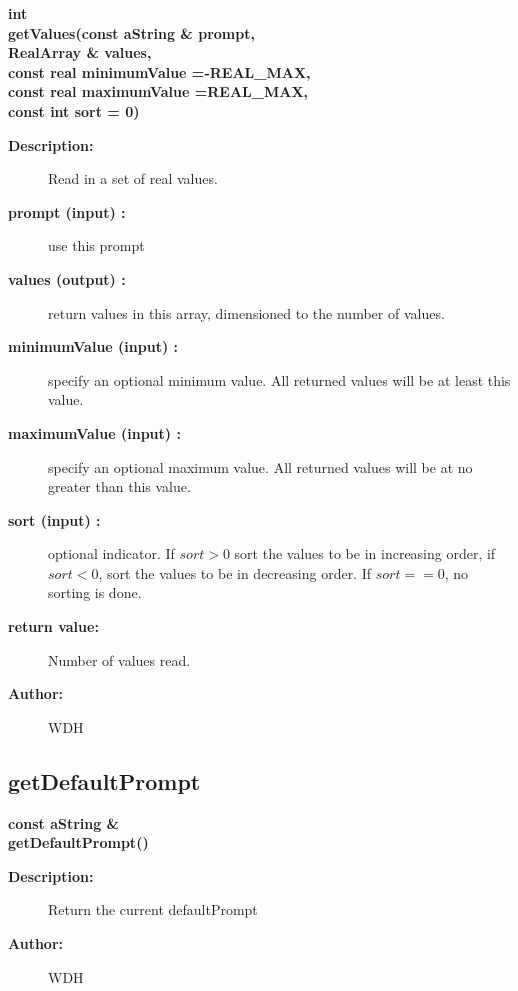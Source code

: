 \begin{flushleft} \textbf{%
int  \\ 
\settowidth{\GenericGraphicsInterfaceIncludeArgIndent}{getValues(}%
getValues(const aString \& prompt, \\ 
\hspace{\GenericGraphicsInterfaceIncludeArgIndent}RealArray \& values,\\ 
\hspace{\GenericGraphicsInterfaceIncludeArgIndent}const real minimumValue  =-REAL\_MAX, \\ 
\hspace{\GenericGraphicsInterfaceIncludeArgIndent}const real maximumValue  =REAL\_MAX,\\ 
\hspace{\GenericGraphicsInterfaceIncludeArgIndent}const int sort  = 0)
}\end{flushleft}
\begin{description}
\item[{\bf Description:}] 
    Read in a set of real values.
\item[{\bf prompt (input) :}]  use this prompt
\item[{\bf values (output) :}]  return values in this array, dimensioned to the number of values.
\item[{\bf minimumValue (input) :}]  specify an optional minimum value. All returned values will be at least this value.
\item[{\bf maximumValue (input) :}]  specify an optional maximum value. All returned values will be at no greater than
        this value.
\item[{\bf sort (input) :}]  optional indicator. If $sort>0$  sort the values to be in increasing order, if $sort<0$,
    sort the values to be in decreasing order. If $sort==0$, no sorting is done.
\item[{\bf return value:}]   Number of values read.
\item[{\bf Author:}]  WDH
\end{description}
\subsection{getDefaultPrompt}
 
\begin{flushleft} \textbf{%
const aString \&   \\ 
\settowidth{\GenericGraphicsInterfaceIncludeArgIndent}{getDefaultPrompt(}%
getDefaultPrompt()
}\end{flushleft}
\begin{description}
\item[{\bf Description:}] 
    Return the current defaultPrompt
\item[{\bf Author:}]  WDH
\end{description}
